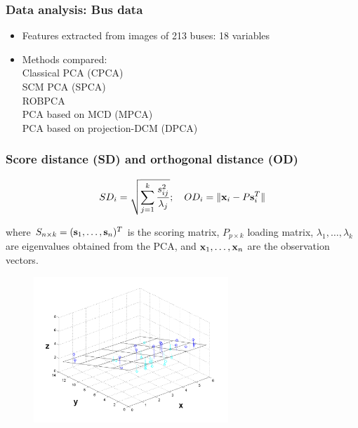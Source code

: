\documentclass[handout,10pt]{beamer}
\begin{document}
\begin{frame}
\frametitle{Data analysis: Bus data}
\begin{itemize}
\item Features extracted from images of 213 buses: 18 variables
\vspace{.2cm}

\item Methods compared:\\
\vspace{.2cm}
Classical PCA (CPCA)\\
SCM PCA (SPCA)\\
ROBPCA \citep{hubert05}\\
PCA based on MCD (MPCA)\\
PCA based on projection-DCM (DPCA)
\vspace{.2cm}
\end{itemize}
\end{frame}

\begin{frame}
\frametitle{Score distance (SD) and orthogonal distance (OD)}
$$ SD_i = \sqrt{ \sum_{j=1}^k \frac{s^2_{ij}}{\lambda_j}}; \quad OD_i = \| {\bf{x}}_i - P{\bf{s}}_i^T \| $$

\begin{footnotesize}
where $S_{n\times k} = ({\bf{s}}_1, \ldots ,{\bf{s}}_n)^T$ is the scoring matrix, $P_{p\times k}$ loading matrix, $\lambda_1,\ldots ,\lambda_k$ are eigenvalues obtained from the PCA, and ${\bf{x}}_1,\ldots,{\bf{x}}_n$ are the observation vectors.
\end{footnotesize}

\begin{figure}[h]
	\centering
		\includegraphics[height=5.5cm]{ScoreOrtho}
	\label{fig:ScoreOrthoPlot}
\end{figure}
\end{frame}
\end{document}
